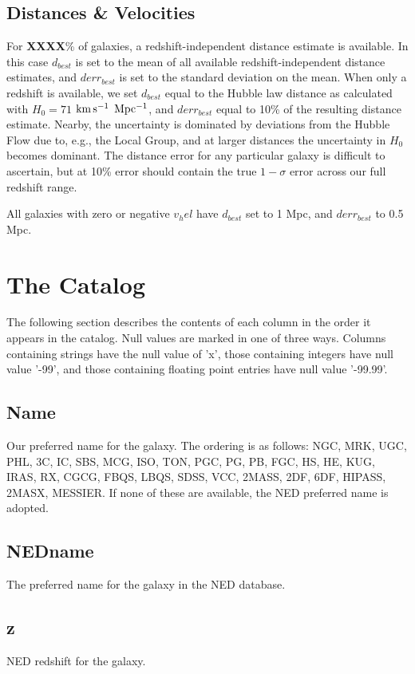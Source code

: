 \documentclass[iop]{emulateapj-rtx4}
\newcommand{\kms}{$\rm km\, s^{-1}$}
\begin{document}
\subsection{Distances \& Velocities}
For \textbf{XXXX}\% of galaxies, a redshift-independent distance estimate is available. In this case $d_{best}$ is set to the mean of all available redshift-independent distance estimates, and $derr_{best}$ is set to the standard deviation on the mean. When only a redshift is available, we set $d_{best}$ equal to the Hubble law distance as calculated with $H_0 = 71$ \kms $~\rm Mpc^{-1}$, and $derr_{best}$ equal to 10\% of the resulting distance estimate. Nearby, the uncertainty is dominated by deviations from the Hubble Flow due to, e.g., the Local Group, and at larger distances the uncertainty in $H_0$ becomes dominant. The distance error for any particular galaxy is difficult to ascertain, but at 10\% error should contain the true $1-\sigma$ error across our full redshift range.

All galaxies with zero or negative $v_hel$ have $d_{best}$ set to 1 Mpc, and $derr_{best}$ to 0.5 Mpc. 


\section{The Catalog}
The following section describes the contents of each column in the order it appears in the catalog. Null values are marked in one of three ways. Columns containing strings have the null value of 'x', those containing integers have null value '-99', and those containing floating point entries have null value '-99.99'.

\subsection{Name}
Our preferred name for the galaxy. The ordering is as follows: NGC, MRK, UGC, PHL, 3C, IC, SBS, MCG, ISO, TON, PGC, PG, PB, FGC, HS, HE, KUG, IRAS, RX, CGCG, FBQS, LBQS, SDSS, VCC, 2MASS, 2DF, 6DF, HIPASS, 2MASX, MESSIER. If none of these are available, the NED preferred name is adopted.

\subsection{NEDname}
The preferred name for the galaxy in the NED database.

\subsection{z}
NED redshift for the galaxy. 
\end{document}
